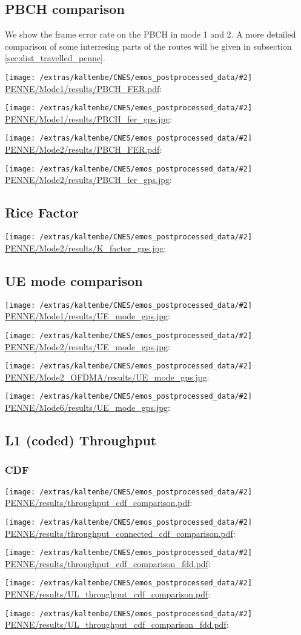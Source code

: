 \documentclass[a4paper,10pt]{article}
\newcommand{\printfile}[2][]{
 \begin{minipage}{8cm}
  \centering
  \texttt{[image: /extras/kaltenbe/CNES/emos\_postprocessed\_data/\#2]}
  \url{#2}: #1

 \end{minipage}
}
\begin{document}
\subsection{PBCH comparison}
We show the frame error rate on the PBCH in mode 1 and 2. A more detailed comparison of some interresing parts of the routes will be given in subsection \ref{sec:dist_travelled_penne}.

\printfile{PENNE/Mode1/results/PBCH_FER.pdf}
\printfile{PENNE/Mode1/results/PBCH_fer_gps.jpg}

\printfile{PENNE/Mode2/results/PBCH_FER.pdf}
\printfile{PENNE/Mode2/results/PBCH_fer_gps.jpg}

\subsection{Rice Factor}

\printfile{PENNE/Mode2/results/K_factor_gps.jpg}

\subsection{UE mode comparison}

\printfile{PENNE/Mode1/results/UE_mode_gps.jpg}
\printfile{PENNE/Mode2/results/UE_mode_gps.jpg}

\printfile{PENNE/Mode2_OFDMA/results/UE_mode_gps.jpg}
\printfile{PENNE/Mode6/results/UE_mode_gps.jpg}

\subsection{L1 (coded) Throughput}


\subsubsection{CDF}


\printfile{PENNE/results/throughput_cdf_comparison.pdf}
\printfile{PENNE/results/throughput_connected_cdf_comparison.pdf}

\printfile{PENNE/results/throughput_cdf_comparison_fdd.pdf}

\printfile{PENNE/results/UL_throughput_cdf_comparison.pdf}
\printfile{PENNE/results/UL_throughput_cdf_comparison_fdd.pdf}
\end{document}
